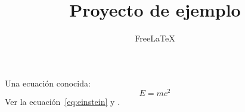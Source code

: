 \documentclass[12pt]{article}
\title{Proyecto de ejemplo}
\author{FreeLaTeX}
\begin{document}
\maketitle



Una ecuación conocida:
\begin{equation}
  E = mc^2 \label{eq:einstein}
\end{equation}
Ver la ecuación~\eqref{eq:einstein} y \cite{knuth1984}.

\printbibliography
\end{document}

